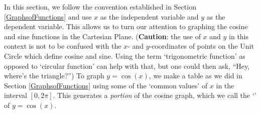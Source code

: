 
\medskip


 
In this section, we follow the convention established in Section \ref{GraphsofFunctions} and use $x$ as the independent variable and $y$ as the dependent variable. This allows us to turn our attention to graphing the cosine and sine functions in the Cartesian Plane. (\textbf{Caution}: the use of $x$ and $y$ in this context is not to be confused with the $x$- and $y$-coordinates of points on the Unit Circle which define cosine and sine.  Using the term `trigonometric function' as opposed to `circular function' can help with that, but one could then ask, ``Hey, where's the triangle?'') To graph $y = \cos(x)$, we make a table as we did in Section \ref{GraphsofFunctions} using some of the `common values' of $x$ in the interval $[0,2\pi]$. This generates a \textit{portion} of the cosine graph, which we call the `' of $y = \cos(x)$. 

